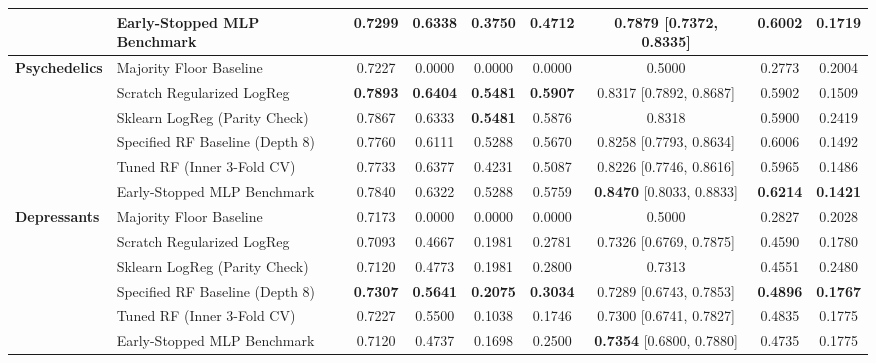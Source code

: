 \begin{table}[t]
{\begin{tabular}{llccccccc}
 & Early-Stopped MLP Benchmark & 0.7299 & 0.6338 & 0.3750 & 0.4712 & 0.7879 [0.7372, 0.8335] & 0.6002 & 0.1719 \\
\hline
\textbf{Psychedelics} & Majority Floor Baseline & 0.7227 & 0.0000 & 0.0000 & 0.0000 & 0.5000 & 0.2773 & 0.2004 \\
 & Scratch Regularized LogReg & \textbf{0.7893} & \textbf{0.6404} & \textbf{0.5481} & \textbf{0.5907} & 0.8317 [0.7892, 0.8687] & 0.5902 & 0.1509 \\
 & Sklearn LogReg (Parity Check) & 0.7867 & 0.6333 & \textbf{0.5481} & 0.5876 & 0.8318 & 0.5900 & 0.2419 \\
 & Specified RF Baseline (Depth 8) & 0.7760 & 0.6111 & 0.5288 & 0.5670 & 0.8258 [0.7793, 0.8634] & 0.6006 & 0.1492 \\
 & Tuned RF (Inner 3-Fold CV) & 0.7733 & 0.6377 & 0.4231 & 0.5087 & 0.8226 [0.7746, 0.8616] & 0.5965 & 0.1486 \\
 & Early-Stopped MLP Benchmark & 0.7840 & 0.6322 & 0.5288 & 0.5759 & \textbf{0.8470} [0.8033, 0.8833] & \textbf{0.6214} & \textbf{0.1421} \\
\hline
\textbf{Depressants} & Majority Floor Baseline & 0.7173 & 0.0000 & 0.0000 & 0.0000 & 0.5000 & 0.2827 & 0.2028 \\
 & Scratch Regularized LogReg & 0.7093 & 0.4667 & 0.1981 & 0.2781 & 0.7326 [0.6769, 0.7875] & 0.4590 & 0.1780 \\
 & Sklearn LogReg (Parity Check) & 0.7120 & 0.4773 & 0.1981 & 0.2800 & 0.7313 & 0.4551 & 0.2480 \\
 & Specified RF Baseline (Depth 8) & \textbf{0.7307} & \textbf{0.5641} & \textbf{0.2075} & \textbf{0.3034} & 0.7289 [0.6743, 0.7853] & \textbf{0.4896} & \textbf{0.1767} \\
 & Tuned RF (Inner 3-Fold CV) & 0.7227 & 0.5500 & 0.1038 & 0.1746 & 0.7300 [0.6741, 0.7827] & 0.4835 & 0.1775 \\
 & Early-Stopped MLP Benchmark & 0.7120 & 0.4737 & 0.1698 & 0.2500 & \textbf{0.7354} [0.6800, 0.7880] & 0.4735 & 0.1775 \\
\hline \hline
\end{tabular}%
}
\end{table}
